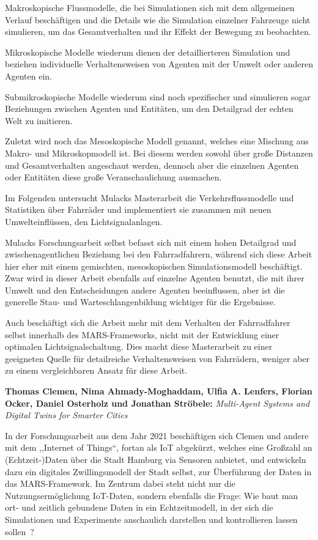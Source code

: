 Makroskopische Flussmodelle, die bei Simulationen sich mit dem allgemeinen Verlauf beschäftigen und die Details wie die Simulation einzelner Fahrzeuge nicht simulieren, um das Gesamtverhalten und ihr Effekt der Bewegung zu beobachten\cite{Mulack2020}.

Mikroskopische Modelle wiederum dienen der detaillierteren Simulation und beziehen individuelle Verhaltensweisen von Agenten mit der Umwelt oder anderen Agenten ein\cite{Mulack2020}.

Submikroskopische Modelle wiederum sind noch spezifischer und simulieren sogar Beziehungen zwischen Agenten und Entitäten, um den Detailgrad der echten Welt zu imitieren\cite{Mulack2020}.

Zuletzt wird noch das Mesoskopische Modell genannt, welches eine Mischung aus Makro- und Mikroskopmodell ist.
Bei diesem werden sowohl über große Distanzen und Gesamtverhalten angeschaut werden, dennoch aber die einzelnen Agenten oder Entitäten diese große Veranschaulichung ausmachen\cite{Mulack2020}.

Im Folgenden untersucht Mulacks Masterarbeit die Verkehrsflussmodelle und Statistiken über Fahrräder und implementiert sie zusammen mit neuen Umwelteinflüssen, den Lichtsignalanlagen.

Mulacks Forschungsarbeit selbst befasst sich mit einem hohen Detailgrad und zwischenagentlichen Beziehung bei den Fahrradfahrern, während sich diese Arbeit hier eher mit einem gemischten, mesoskopischen Simulationsmodell beschäftigt.
Zwar wird in dieser Arbeit ebenfalls auf einzelne Agenten benutzt, die mit ihrer Umwelt und den Entscheidungen andere Agenten beeinflussen, aber ist die generelle Stau- und Warteschlangenbildung wichtiger für die Ergebnisse.

Auch beschäftigt sich die Arbeit mehr mit dem Verhalten der Fahrradfahrer selbst innerhalb des MARS-Frameworks, nicht mit der Entwicklung einer optimalen Lichtsignalschaltung.
Dies macht diese Masterarbeit zu einer geeigneten Quelle für detailreiche Verhaltensweisen von Fahrrädern, weniger aber zu einem vergleichbaren Ansatz für diese Arbeit.


\textbf{Thomas Clemen, Nima Ahmady-Moghaddam, Ulfia A. Lenfers, Florian Ocker, Daniel Osterholz und Jonathan Ströbele:}
\textit{Multi-Agent Systems and Digital Twins for Smarter Cities}

In der Forschungsarbeit aus dem Jahr 2021 beschäftigen sich Clemen und andere mit dem ,,Internet of Things``, fortan als IoT abgekürzt, welches eine Großzahl an (Echtzeit-)Daten über die Stadt Hamburg via Sensoren anbietet, und entwickeln dazu ein digitales Zwillingsmodell der Stadt selbst, zur Überführung der Daten in das MARS-Framework.
Im Zentrum dabei steht nicht nur die Nutzungsermöglichung IoT-Daten, sondern ebenfalls die Frage: Wie baut man ort- und zeitlich gebundene Daten in ein Echtzeitmodell, in der sich die Simulationen und Experimente anschaulich darstellen und kontrollieren lassen sollen~\cite{Clemen2021}?

